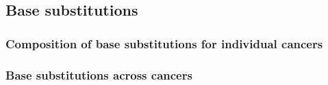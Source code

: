\subsection{Base substitutions}\label{methods:spectra}
\subsubsection{Composition of base substitutions for individual cancers}



\subsubsection{Base substitutions across cancers}

